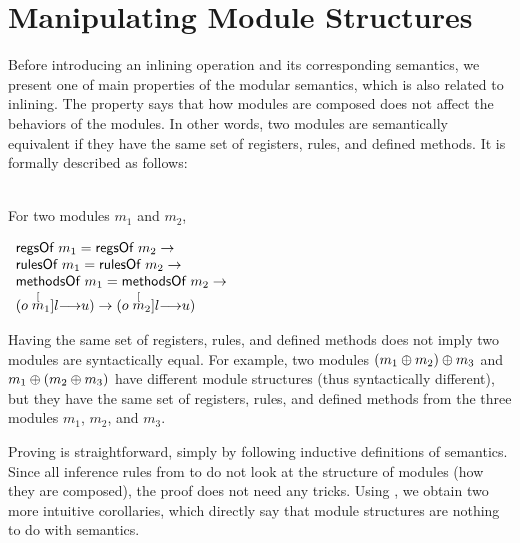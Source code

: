 \section{Manipulating Module Structures}

Before introducing an inlining operation and its corresponding
semantics, we present one of main properties of the modular semantics,
which is also related to inlining. The property says that how modules
are composed does not affect the behaviors of the modules. In other
words, two modules are semantically equivalent if they have the same
set of registers, rules, and defined methods. It is formally described
as follows:

\begin{lemma}
  \label{lem-equiv-modules}
  \mbox{}\\
  For two modules $m_1$ and $m_2$,
  \begin{center}
    \begin{math}
      \begin{array}{l}
        \regsofm{m_1} = \regsofm{m_2} \to \\
        \rulesofm{m_1} = \rulesofm{m_2} \to \\
        \methsofm{m_1} = \methsofm{m_2} \to \\
        (\semstep{m_1}{o}{u}{l}) \to (\semstep{m_2}{o}{u}{l})
      \end{array}
    \end{math}
    \end{center}
\end{lemma}

Having the same set of registers, rules, and defined methods does not
imply two modules are syntactically equal. For example, two modules
$\modcomp{(\modcomp{m_1}{m_2})}{m_3}$ and
$\modcomp{m_1}{(\modcomp{m_2}{m_3})}$ have different module structures
(thus syntactically different), but they have the same set of
registers, rules, and defined methods from the three modules $m_1$,
$m_2$, and $m_3$.

Proving  is straightforward, simply by
following inductive definitions of semantics. Since all inference
rules from \Substep{} to \Step{} do not look at the structure of
modules (how they are composed), the proof does not need any tricks.
Using , we obtain two more intuitive
corollaries, which directly say that module structures are nothing to
do with semantics.


